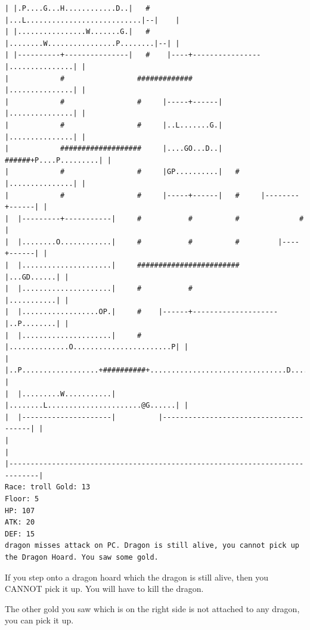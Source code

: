 \documentclass[11pt]{article}
\theoremstyle{plain}
\begin{document}
\begin{Verbatim}[fontsize=\scriptsize]
| |.P....G...H............D..|   #    |...L...........................|--|    |
| |................W.......G.|   #    |........W................P........|--| |
| |----------+---------------|   #    |----+----------------|...............| |
|            #                 #############                |...............| |
|            #                 #     |-----+------|         |...............| |
|            #                 #     |..L.......G.|         |...............| |
|            ###################     |....GO...D..|   ######+P....P.........| |
|            #                 #     |GP..........|   #     |...............| |
|            #                 #     |-----+------|   #     |--------+------| |
|  |---------+-----------|     #           #          #              #        |
|  |........O............|     #           #          #         |----+------| |
|  |.....................|     ########################         |...GD......| |
|  |.....................|     #           #                    |...........| |
|  |..................OP.|     #    |------+--------------------|..P........| |
|  |.....................|     #    |..............O.......................P| |
|  |..P..................+##########+................................D......| |
|  |.........W...........|          |........L......................@G......| |
|  |---------------------|          |---------------------------------------| |
|                                                                             |
|-----------------------------------------------------------------------------|
Race: troll Gold: 13                                                   Floor: 5
HP: 107
ATK: 20
DEF: 15
dragon misses attack on PC. Dragon is still alive, you cannot pick up the Dragon Hoard. You saw some gold. 
\end{Verbatim}

If you step onto a dragon hoard which the dragon is still alive, then you
CANNOT pick it up. You will have to kill the dragon.

The other gold you saw which is on the right side 
is not attached to any dragon, you can pick it up.
\end{document}
